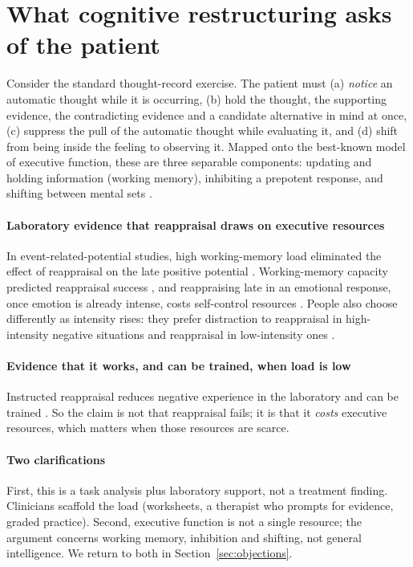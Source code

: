 \section{What cognitive restructuring asks of the patient}\label{sec:demands}
Consider the standard thought-record exercise. The patient must (a) \emph{notice} an automatic thought while it is occurring, (b) hold the thought, the supporting evidence, the contradicting evidence and a candidate alternative in mind at once, (c) suppress the pull of the automatic thought while evaluating it, and (d) shift from being inside the feeling to observing it. Mapped onto the best-known model of executive function, these are three separable components: updating and holding information (working memory), inhibiting a prepotent response, and shifting between mental sets \citep{miyake2000unity}.

\paragraph{Laboratory evidence that reappraisal draws on executive resources} In event-related-potential studies, high working-memory load eliminated the effect of reappraisal on the late positive potential \citep{gan2017load,adamczyk2022load}. Working-memory capacity predicted reappraisal success \citep{schmeichel2008memory}, and reappraising late in an emotional response, once emotion is already intense, costs self-control resources \citep{sheppes2008costs}. People also choose differently as intensity rises: they prefer distraction to reappraisal in high-intensity negative situations and reappraisal in low-intensity ones \citep{sheppes2011choice}.

\paragraph{Evidence that it works, and can be trained, when load is low} Instructed reappraisal reduces negative experience in the laboratory \citep{hofmann2009anxiety} and can be trained \citep{denny2014training}. So the claim is not that reappraisal fails; it is that it \emph{costs} executive resources, which matters when those resources are scarce.

\paragraph{Two clarifications} First, this is a task analysis plus laboratory support, not a treatment finding. Clinicians scaffold the load (worksheets, a therapist who prompts for evidence, graded practice). Second, executive function is not a single resource; the argument concerns working memory, inhibition and shifting, not general intelligence. We return to both in Section~\ref{sec:objections}.
